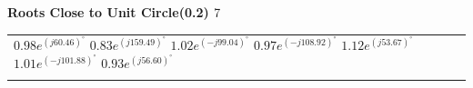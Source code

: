 \begin{center}
{ \bf{ Roots Close to Unit Circle(0.2) } } 7 \\ 
\begin{tabular}{ | p{16cm} | }
 \hline $0.98e^{(j60.46)^\circ}$ $0.83e^{(j159.49)^\circ}$ $1.02e^{(-j99.04)^\circ}$ $0.97e^{(-j108.92)^\circ}$ $1.12e^{(j53.67)^\circ}$ $1.01e^{(-j101.88)^\circ}$ $0.93e^{(j56.60)^\circ}$ \\ 
\\ \hline 
 \end{tabular}
\end{center}

